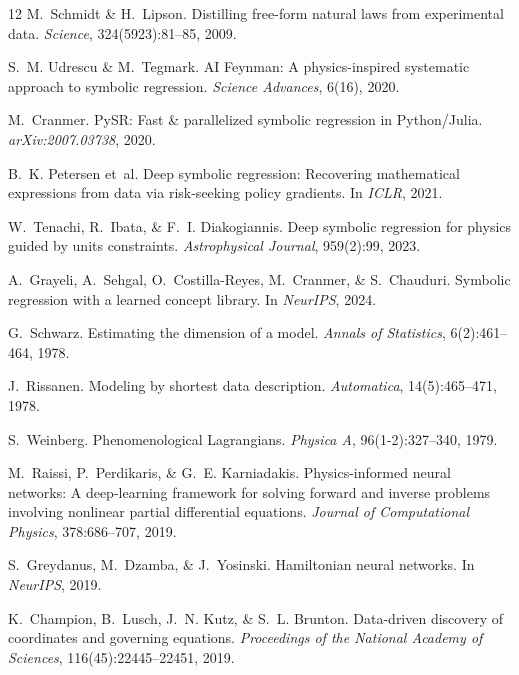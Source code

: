 \documentclass{article}
\begin{document}

\begin{thebibliography}{12}
\scriptsize
\setlength{\itemsep}{0pt}
M.~Schmidt \& H.~Lipson.
\newblock Distilling free-form natural laws from experimental data.
\newblock \emph{Science}, 324(5923):81--85, 2009.

S.~M. Udrescu \& M.~Tegmark.
\newblock AI Feynman: A physics-inspired systematic approach to symbolic regression.
\newblock \emph{Science Advances}, 6(16), 2020.

M.~Cranmer.
\newblock PySR: Fast \& parallelized symbolic regression in Python/Julia.
\newblock \emph{arXiv:2007.03738}, 2020.

B.~K. Petersen et~al.
\newblock Deep symbolic regression: Recovering mathematical expressions from data via risk-seeking policy gradients.
\newblock In \emph{ICLR}, 2021.

W.~Tenachi, R.~Ibata, \& F.~I. Diakogiannis.
\newblock Deep symbolic regression for physics guided by units constraints.
\newblock \emph{Astrophysical Journal}, 959(2):99, 2023.

A.~Grayeli, A.~Sehgal, O.~Costilla-Reyes, M.~Cranmer, \& S.~Chauduri.
\newblock Symbolic regression with a learned concept library.
\newblock In \emph{NeurIPS}, 2024.

G.~Schwarz.
\newblock Estimating the dimension of a model.
\newblock \emph{Annals of Statistics}, 6(2):461--464, 1978.

J.~Rissanen.
\newblock Modeling by shortest data description.
\newblock \emph{Automatica}, 14(5):465--471, 1978.

S.~Weinberg.
\newblock Phenomenological Lagrangians.
\newblock \emph{Physica A}, 96(1-2):327--340, 1979.

M.~Raissi, P.~Perdikaris, \& G.~E. Karniadakis.
\newblock Physics-informed neural networks: A deep-learning framework for solving forward and inverse problems involving nonlinear partial differential equations.
\newblock \emph{Journal of Computational Physics}, 378:686--707, 2019.

S.~Greydanus, M.~Dzamba, \& J.~Yosinski.
\newblock Hamiltonian neural networks.
\newblock In \emph{NeurIPS}, 2019.

K.~Champion, B.~Lusch, J.~N. Kutz, \& S.~L. Brunton.
\newblock Data-driven discovery of coordinates and governing equations.
\newblock \emph{Proceedings of the National Academy of Sciences}, 116(45):22445--22451, 2019.
\end{thebibliography}
\end{document}
